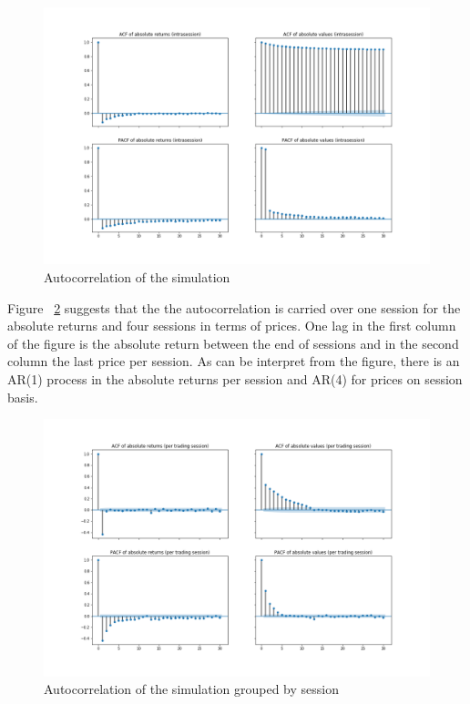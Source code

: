 \begin{figure}
    \includegraphics[width=\linewidth]{plots/basic_autocorrelation_intra.png}
    \caption{Autocorrelation of the simulation}
    \label{fig:basic_autocorr}
\end{figure}

Figure ~\ref{fig:basic_autocorr_per_session} suggests that the the autocorrelation is carried over one
session for the absolute returns and four sessions in terms of prices. One lag in the first column of the 
figure is the absolute return between the end of sessions and in the second column the last price per session. 
As can be interpret from the figure, there is an AR(1) process in the absolute returns per session and AR(4) 
for prices on session basis.

\begin{figure}
    \includegraphics[width=\linewidth]{plots/basic_autocorrelation.png}
    \caption{Autocorrelation of the simulation grouped by session}
    \label{fig:basic_autocorr_per_session}
\end{figure}


